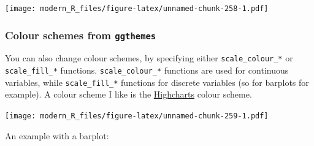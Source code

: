 \documentclass[]{gitbook}
\newenvironment{Shaded}{\begin{snugshade}}{\end{snugshade}}
\newcommand{\DataTypeTok}[1]{\textcolor[rgb]{0.13,0.29,0.53}{#1}}
\newcommand{\KeywordTok}[1]{\textcolor[rgb]{0.13,0.29,0.53}{\textbf{#1}}}
\newcommand{\NormalTok}[1]{#1}
\newcommand{\OperatorTok}[1]{\textcolor[rgb]{0.81,0.36,0.00}{\textbf{#1}}}
\newcommand{\StringTok}[1]{\textcolor[rgb]{0.31,0.60,0.02}{#1}}
\theoremstyle{definition}
\theoremstyle{definition}
\theoremstyle{definition}
\theoremstyle{remark}
\begin{document}
\texttt{[image: modern\_R\_files/figure-latex/unnamed-chunk-258-1.pdf]}

\hypertarget{colour-schemes-from-ggthemes}{%
\subsubsection{\texorpdfstring{Colour schemes from
\texttt{ggthemes}}{Colour schemes from ggthemes}}\label{colour-schemes-from-ggthemes}}

You can also change colour schemes, by specifying either
\texttt{scale\_colour\_*} or \texttt{scale\_fill\_*} functions.
\texttt{scale\_colour\_*} functions are used for continuous variables,
while \texttt{scale\_fill\_*} functions for discrete variables (so for
barplots for example). A colour scheme I like is the
\href{https://www.highcharts.com/}{Highcharts} colour scheme.

\begin{Shaded}
\end{Shaded}

\texttt{[image: modern\_R\_files/figure-latex/unnamed-chunk-259-1.pdf]}

An example with a barplot:
\end{document}
